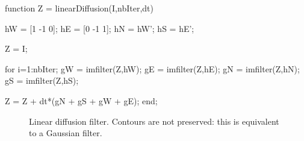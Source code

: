 \begin{matlab}
function Z = linearDiffusion(I,nbIter,dt)

hW = [1 -1 0];
hE = [0 -1 1];
hN = hW';
hS = hE';

Z = I; %

for i=1:nbIter;
    gW = imfilter(Z,hW);
    gE = imfilter(Z,hE);
    gN = imfilter(Z,hN);
    gS = imfilter(Z,hS);
    
    Z = Z + dt*(gN + gS + gW + gE);
end;
\end{matlab}
\begin{figure}[htbp]
\centering
{}\hfill
{}\hfill
{}
\caption{Linear diffusion filter. Contours are not preserved: this is equivalent to a Gaussian filter.}
\label{fig:pde:matlab:ld}
\end{figure}

